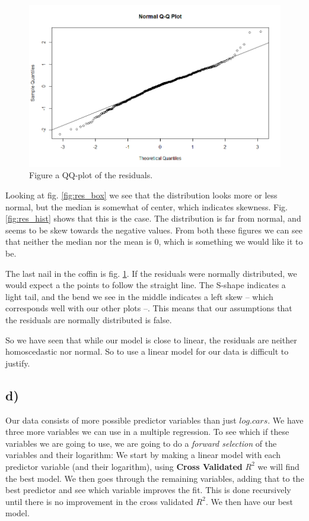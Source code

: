 \documentclass[a4paper,norsk, 10pt]{article}
\begin{document}
\begin{figure}[!htbp]
\centering
\includegraphics[scale=0.5]{res_qq.png}
\caption{Figure a QQ-plot of the residuals.}\label{fig:res_qq}
\end{figure}


Looking at fig. \ref{fig:res_box} we see that the distribution looks more or less normal, but the median is somewhat of center, which indicates skewness. Fig. \ref{fig:res_hist} shows that this is the case. The distribution is far from normal, and seems to be skew towards the negative values. From both these figures we can see that neither the median nor the mean is $0$, which is something we would like it to be.

The last nail in the coffin is fig. \ref{fig:res_qq}. If the residuals were normally distributed, we would expect a the points to follow the straight line. The S-shape indicates a light tail, and the bend we see in the middle indicates a left skew -- which corresponds well with our other plots --. This means that our assumptions that the residuals are normally distributed is false.


So we have seen that while our model is close to linear, the residuals are neither homoscedastic nor normal. So to use a linear model for our data is difficult to justify.



\subsection*{d)}

Our data consists of more possible predictor variables than just $log.cars$. We have three more variables we can use in a multiple regression. To see which if these variables we are going to use, we are going to do a \textit{forward selection} of the variables and their logarithm: We start by making a linear model with each predictor variable (and their logarithm), using \textbf{Cross Validated} $R^2$ we will find the best model. We then goes through the remaining variables, adding that to the best predictor and see which variable improves the fit. This is done recursively until there is no improvement in the cross validated $R^2$. We then have our best model. 
\end{document}
